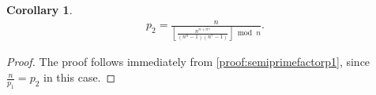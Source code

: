 \documentclass[11pt,reqno]{article}
\theoremstyle{plain}
\newtheorem{corollary}[theorem]{Corollary}
\theoremstyle{definition}
\newcommand{\floor}[1]{\left\lfloor #1 \right\rfloor}
\begin{document}
\begin{corollary} \label{proof:semiprimefactorp2}
\begin{align*}
p_2 = \frac{n}{\floor{\frac{n^{n+n\gamma}}{(n^n-1)(n^{\gamma}-1)}}\bmod n}.
\end{align*}
\end{corollary}
\begin{proof}
The proof follows immediately from \cref{proof:semiprimefactorp1}, since $\frac{n}{p_1} = p_2$ in this case.
\end{proof}

\begingroup
\raggedright


\endgroup
\end{document}
